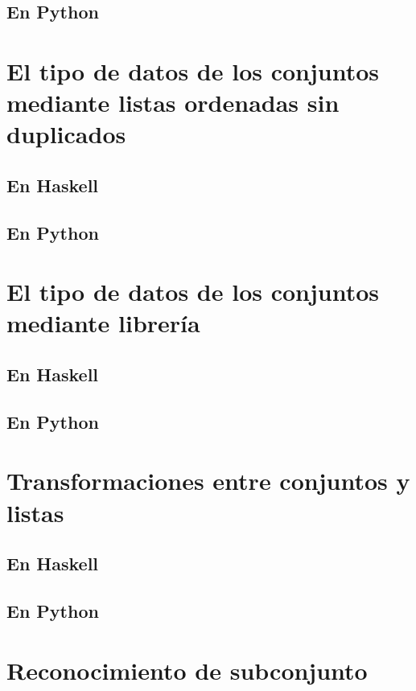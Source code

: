 \documentclass[a4paper,12pt,twoside]{book}
\begin{document}
\subsection{En Python}

\section{El tipo de datos de los conjuntos mediante listas ordenadas sin duplicados}
\subsection{En Haskell}
\subsection{En Python}

\section{El tipo de datos de los conjuntos mediante librería}
\subsection{En Haskell}
\subsection{En Python}

\section{Transformaciones entre conjuntos y listas}
\subsection{En Haskell}
\subsection{En Python}

\section{Reconocimiento de subconjunto}
\end{document}
